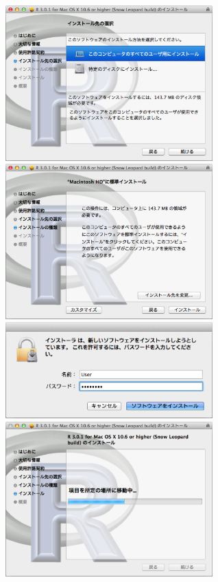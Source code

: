 \includegraphics[width=8cm]{img/osx/osx006.eps}\hspace{0.8em} \includegraphics[width=8cm]{img/osx/osx007.eps}\\

\includegraphics[width=8cm]{img/osx/osx008.eps}\hspace{0.8em} \includegraphics[width=8cm]{img/osx/osx009.eps}\\

